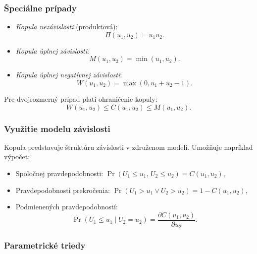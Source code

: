 \subsubsection{Špeciálne prípady}

\begin{itemize}
  \item \textit{Kopula nezávislosti} (produktová):
  \begin{equation}
  \Pi(u_1, u_2) = u_1 u_2.
  \end{equation}
  \item \textit{Kopula úplnej závislosti}:
  \begin{equation}
  M(u_1,u_2) = \min(u_1, u_2).
  \end{equation}
  \item \textit{Kopula úplnej negatívnej závislosti}:
  \begin{equation}
  W(u_1, u_2) = \max(0, u_1 + u_2 - 1).
  \end{equation}
\end{itemize}

Pre dvojrozmerný prípad platí ohraničenie kopuly:
\[
W(u_1, u_2) \leq C(u_1, u_2) \leq M(u_1, u_2).
\]

\subsubsection{Využitie modelu závislosti}

Kopula predstavuje štruktúru závislosti v združenom modeli. Umožňuje napríklad výpočet:

\begin{itemize}
  \item Spoločnej pravdepodobnosti: $\Pr(U_1 \leq u_1,\, U_2 \leq u_2) = C(u_1, u_2)$,
  \item Pravdepodobnosti prekročenia: $\Pr(U_1 > u_1 \vee U_2 > u_2) = 1 - C(u_1, u_2)$,
  \item Podmienených pravdepodobností:
  \[
  \Pr(U_1 \leq u_1 \mid U_2 = u_2) = \frac{\partial C(u_1, u_2)}{\partial u_2}.
  \]
\end{itemize}

\subsubsection{Parametrické triedy}\label{subsubsec:parametric_copula}

